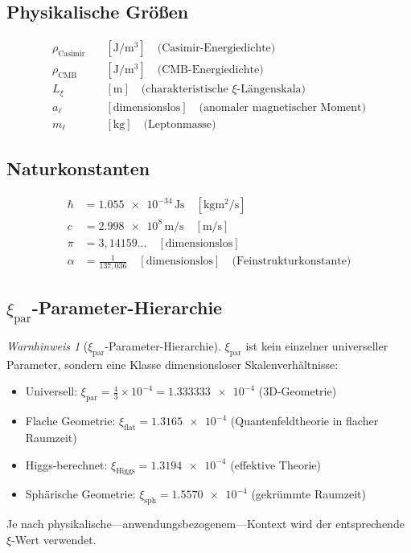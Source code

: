 \documentclass[12pt,a4paper]{article}
\theoremstyle{remark}
\newtheorem{warning}{Warnhinweis}
\begin{document}
	\subsection{Physikalische Größen}
	\begin{align}
		\rho_{\text{Casimir}} &\quad [\si{\joule\per\cubic\metre}] \quad \text{(Casimir-Energiedichte)} \\
		\rho_{\text{CMB}} &\quad [\si{\joule\per\cubic\metre}] \quad \text{(CMB-Energiedichte)} \\
		L_{\xi} &\quad [\si{\metre}] \quad \text{(charakteristische \(\xi\)-Längenskala)} \\
		a_\ell &\quad [\text{dimensionslos}] \quad \text{(anomaler magnetischer Moment)} \\
		m_\ell &\quad [\si{\kilogram}] \quad \text{(Leptonmasse)}
	\end{align}
	
	\subsection{Naturkonstanten}
	\begin{align}
		\hbar &= \num{1,055e-34} \, \si{\joule\second} \quad [\si{\kilogram\metre\squared\per\second}] \\
		c &= \num{2,998e8} \, \si{\metre\per\second} \quad [\si{\metre\per\second}] \\
		\pi &= 3,14159\ldots \quad [\text{dimensionslos}] \\
		\alpha &= \frac{1}{137,036} \quad [\text{dimensionslos}] \quad \text{(Feinstrukturkonstante)}
	\end{align}
	
	\subsection{\(\xi_{\text{par}}\)-Parameter-Hierarchie}
	\begin{warning}[\(\xi_{\text{par}}\)-Parameter-Hierarchie]
		\(\xi_{\text{par}}\) ist kein einzelner universeller Parameter, sondern eine Klasse dimensionsloser Skalenverhältnisse:
		\begin{itemize}
			\item Universell: \(\xi_{\text{par}} = \frac{4}{3} \times 10^{-4} = \num{1,333333e-4}\) (3D-Geometrie)
			\item Flache Geometrie: \(\xi_{\text{flat}} = \num{1,3165e-4}\) (Quantenfeldtheorie in flacher Raumzeit)
			\item Higgs-berechnet: \(\xi_{\text{Higgs}} = \num{1,3194e-4}\) (effektive Theorie)
			\item Sphärische Geometrie: \(\xi_{\text{sph}} = \num{1,5570e-4}\) (gekrümmte Raumzeit)
		\end{itemize}
		Je nach physikalische—anwendungsbezogenem—Kontext wird der entsprechende \(\xi\)-Wert verwendet.
	\end{warning}
	
\end{document}
